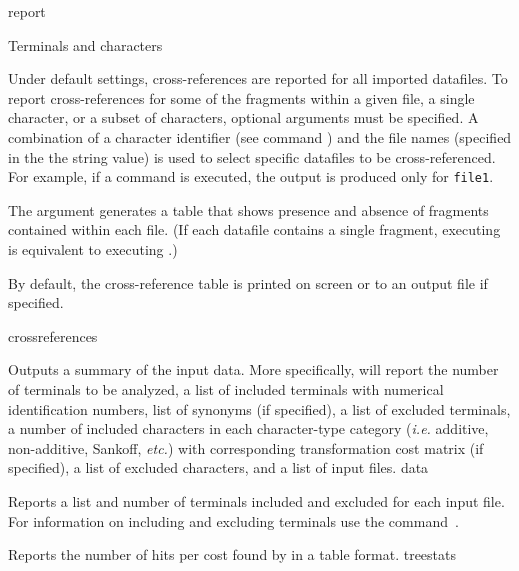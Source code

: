 \begin{command}{report}{}
\begin{arguments}
\begin{argumentgroup}{Terminals and characters}
{                Under default settings, cross-references are reported for
                all imported datafiles. To report cross-references for some of
                the fragments within a given file, a single character, or a subset
                of characters, optional arguments must be specified. A combination of
                a character identifier (see command  ) and
                the file names (specified in the the string value) is used to select specific
                datafiles to be cross-referenced. For example, if a
                command  is
                executed, the output is produced only for \texttt{file1}.
                
                The argument  generates
                a table that shows presence and absence of fragments contained
                within each file. (If each datafile contains a
                single fragment,  executing 
                is equivalent to executing .)
                
                By default, the cross-reference table is printed on screen or to an
                output file if specified.}
                {crossreferences}

                {Outputs a summary of the input data.
                More specifically, \poy will report the number of
                terminals to be analyzed, a list of included terminals with
                numerical identification numbers, list
                of synonyms (if specified), a list of excluded terminals, a
                number of included characters in each character-type category
                (\emph{i.e.} additive, non-additive, Sankoff, \emph{etc.}) with corresponding
                transformation cost matrix (if specified), a list of excluded
                characters, and a list of input files.} 
                {data}

                {Reports a list and number of terminals included and excluded
                for each input file. For information on including and excluding
                terminals use the command~.}
                {}

                {Reports the number of hits per cost found by \poy in a table
                format.}
                {treestats}


\end{argumentgroup}
\end{arguments}
\end{command}
